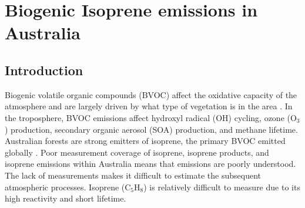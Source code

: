 
%
%



\chapter{Biogenic Isoprene emissions in Australia} %
\label{BioIsop}
  
\section{Introduction}  
\label{BioIsop:intro}  
  
  
  
  Biogenic volatile organic compounds (BVOC) affect the oxidative capacity of the atmosphere and are largely driven by what type of vegetation is in the area \parencite{Kefauver2014}.
  In the troposphere, BVOC emissions affect hydroxyl radical (OH) cycling, ozone (O$_3$) production, secondary organic aerosol (SOA) production, and methane lifetime.
  Australian forests are strong emitters of isoprene, the primary BVOC emitted globally \parencite{Guenther2006,Messina2016}. %
  Poor measurement coverage of isoprene, isoprene products, and isoprene emissions within Australia means that emissions are poorly understood.
  The lack of measurements makes it difficult to estimate the subsequent atmospheric processes. 
  Isoprene (C$_5$H$_8$) is relatively difficult to measure due to its high reactivity and short lifetime.
  
